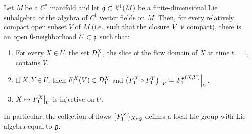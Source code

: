 \begin{thm}[{{\cite[Thm.~1.8.3]{DK}}}]\label{thm 1.8.3 DK}
    Let $M$ be a $C^2$ manifold and let $\mathfrak{g}\subset \mathfrak{X}^1(M)$ be a finite-dimensional Lie subalgebra of the algebra of $C^1$ vector fields on $M$. Then, for every relatively compact open subset $V$ of $M$ (i.e.\ such that the closure $\wb{V}$ is compact), there is an open $0$-neighborhood $U\subset\mathfrak{g}$ such that:
    \begin{enumerate}[label=(\alph*)]
        \item For every $X\in U$, the set $\mathcal{D}^X_{1}$, the slice of the flow domain of $X$ at time $t=1$, contains $V$.
        \item If $X,Y\in U$, then $F^X_1(V)\subset \mathcal{D}^X_1$ and $\restr{\left(F^X_1\circ F^Y_1\right)}{V}=\restr{F_1^{\mu(X,Y)}}{V}$.
        \item $X\mapsto \restr{F^X_1}{V}$ is injective on $U$.
    \end{enumerate}
    In particular, the collection of flows $\{F^X_1\}_{X\in\mathfrak{g}}$ defines a local Lie group with Lie algebra equal to $\mathfrak{g}$.
\end{thm}
